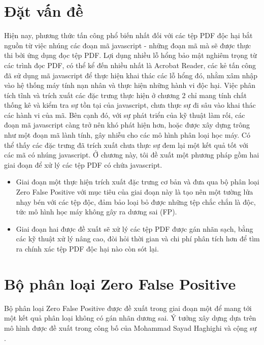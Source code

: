 \documentclass[./../main.tex]{subfiles}
\begin{document}
\section{Đặt vấn đề}
Hiện nay, phương thức tấn công phổ biến nhất đối với các tệp PDF độc hại bắt nguồn từ việc nhúng các đoạn mã javascript - những đoạn mã mà sẽ được thực thi bởi ứng dụng đọc tệp PDF. Lợi dụng nhiều lỗ hổng bảo mật nghiêm trọng từ các trình đọc PDF, có thể kể đến nhiều nhất là Acrobat Reader, các kẻ tấn công đã sử dụng mã javascript để thực hiện khai thác các lỗ hổng đó, nhằm xâm nhập vào hệ thống máy tính nạn nhân và thực hiện những hành vi độc hại. Việc phân tích tĩnh và trích xuất các đặc trưng thực hiện ở chương 2 chỉ mang tính chất thống kê và kiểm tra sự tồn tại của javascript, chưa thực sự đi sâu vào khai thác các hành vi của mã. Bên cạnh đó, với sự phát triển của kỹ thuật làm rối, các đoạn mã javascript càng trở nên khó phát hiện hơn, hoặc được xây dựng trông như một đoạn mã lành tính, gây nhiễu cho các mô hình phân loại học máy. Có thể thấy các đặc trưng đã trích xuất chưa thực sự đem lại một kết quả tốt với các mã có nhúng javascript.
Ở chương này, tôi đề xuất một phương pháp gồm hai giai đoạn để xử lý các tệp PDF có chứa javascript.
\begin{itemize}
	\item Giai đoạn một thực hiện trích xuất đặc trưng cơ bản và đưa qua bộ phân loại Zero False Positive với mục tiêu của giai đoạn này là tạo nên một tường lửa nhạy bén với các tệp độc, đảm bảo loại bỏ được những tệp chắc chắn là độc, tức mô hình học máy không gây ra dương sai (FP).
	\item Giai đoạn hai được đề xuất sẽ xử lý các tệp PDF được gán nhãn sạch, bằng các kỹ thuật xử lý nâng cao, đòi hỏi thời gian và chi phí phân tích hơn để tìm ra chính xác tệp PDF độc hại nào còn sót lại.
\end{itemize}

\section{Bộ phân loại Zero False Positive}
Bộ phân loại Zero False Positive được đề xuất trong giai đoạn một để mang tới một kết quả phân loại không có gán nhãn dương sai. Ý tưởng xây dựng dựa trên mô hình được đề xuất trong công bố của Mohammad Sayad Haghighi và cộng sự \cite{zfp}.
\end{document}
